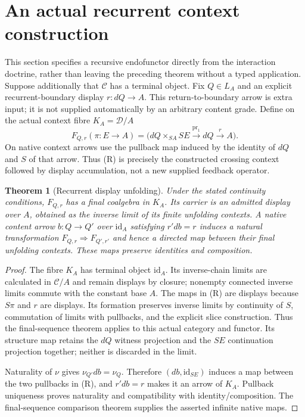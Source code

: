 \documentclass[11pt]{article}
\newtheorem{theorem}{Theorem}\newtheorem{proposition}{Proposition}
\begin{document}
\section{An actual recurrent context construction}
This section specifies a recursive endofunctor directly from the interaction doctrine, rather than leaving the preceding theorem without a typed application. Suppose additionally that $\mathcal C$ has a terminal object. Fix $Q\in L_A$ and an explicit recurrent-boundary display $r:dQ\to A$. This return-to-boundary arrow is extra input; it is not supplied automatically by an arbitrary content grade. Define on the actual context fibre $K_A=\mathcal D/A$
\[
 F_{Q,r}(\pi:E\to A)
   =\bigl(dQ\times_{SA}SE\xrightarrow{\mathrm{pr}_1}dQ\xrightarrow r A\bigr).
\tag{R}
\]
On native context arrows use the pullback map induced by the identity of $dQ$ and $S$ of that arrow. Thus (R) is precisely the constructed crossing context followed by display accumulation, not a new supplied feedback operator.

\begin{theorem}[Recurrent display unfolding]
Under the stated continuity conditions, $F_{Q,r}$ has a final coalgebra in $K_A$. Its carrier is an admitted display over $A$, obtained as the inverse limit of its finite unfolding contexts. A native content arrow $b:Q\to Q'$ over $\mathrm{id}_A$ satisfying $r'db=r$ induces a natural transformation $F_{Q,r}\Rightarrow F_{Q',r'}$ and hence a directed map between their final unfolding contexts. These maps preserve identities and composition.
\end{theorem}
\begin{proof}
The fibre $K_A$ has terminal object $\mathrm{id}_A$. Its inverse-chain limits are calculated in $\mathcal C/A$ and remain displays by closure; nonempty connected inverse limits commute with the constant base $A$. The maps in (R) are displays because $S\pi$ and $r$ are displays. Its formation preserves inverse limits by continuity of $S$, commutation of limits with pullbacks, and the explicit slice construction. Thus the final-sequence theorem applies to this actual category and functor. Its structure map retains the $dQ$ witness projection and the $SE$ continuation projection together; neither is discarded in the limit.

Naturality of $\nu$ gives $\nu_{Q'}db=\nu_Q$. Therefore $(db,\mathrm{id}_{SE})$ induces a map between the two pullbacks in (R), and $r'db=r$ makes it an arrow of $K_A$. Pullback uniqueness proves naturality and compatibility with identity/composition. The final-sequence comparison theorem supplies the asserted infinite native maps.
\end{proof}
\end{document}

